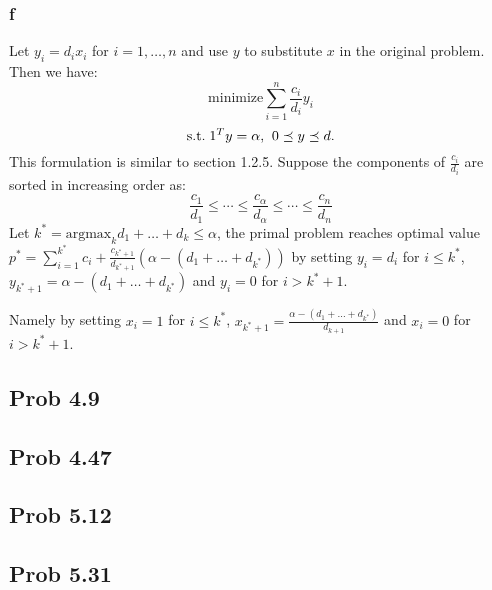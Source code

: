 \message{ !name(ass3_ChangLi.tex)}\documentclass[10pt,a4paper]{article}
\begin{document}
\subsubsection{f}
Let $y_i=d_ix_i$ for $i=1,\dots,n$ and use $y$ to substitute
$x$ in the original problem. Then we have:
$$
\text{minimize} \sum_{i=1}^n \frac{c_i}{d_i}y_i
$$
$$
\text{s.t.\;} 1^Ty=\alpha\text{,\;\;} 0\preceq y \preceq d.
$$
This formulation is similar to section 1.2.5. Suppose the
components of $\frac{c_i}{d_i}$ are sorted in increasing
order as:
$$
\frac{c_1}{d_1}\leq \dotsb \leq \frac{c_\alpha}{d_\alpha} \leq \dotsb \leq\frac{c_n}{d_n} 
$$
Let $k^*=\text{argmax}_kd_1+\dots+d_k\leq \alpha$, the primal problem reaches
optimal value
$p^*=\sum_{i=1}^{k^*}c_i+\frac{c_{k^*+1}}{d_{k^*+1}}(\alpha-(d_1+\dots+d_{k^*}))$
by setting $y_i=d_i$ for $i\leq k^*$, $y_{k^*+1}=\alpha-(d_1+\dots+d_{k^*})$ and
$y_i=0$ for $i>k^*+1$.

Namely by setting $x_i=1$ for $i\leq k^*$, $x_{k^*+1}=\frac{\alpha-(d_1+\dots+d_{k^*})}{d_{k+1}}$ and
$x_i=0$ for $i>k^*+1$.


\subsection{Prob 4.9}



\subsection{Prob 4.47}

\subsection{Prob 5.12}

\subsection{Prob 5.31}


	\renewcommand\refname{Bibliography}
	
	
\end{document}
